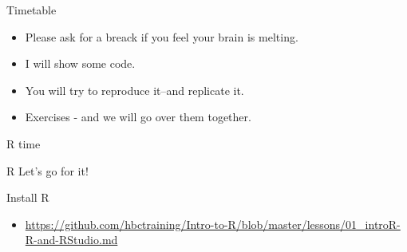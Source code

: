 \documentclass{beamer}
\begin{document}
 \begin{frame}{Timetable}
\begin{itemize}[<+->]
\item Please ask for a breack if you feel your brain is melting.
\item I will show some code.
\item You will try to reproduce it--and replicate it.
\item Exercises - and we will go over them together.
   \end{itemize} 
\end{frame}



\begin{frame}{R time}
\begin{block}{R} 
Let's go for it!
\end{block}
\end{frame}



\begin{frame}{Install R}
\begin{itemize}
\item \url{https://github.com/hbctraining/Intro-to-R/blob/master/lessons/01_introR-R-and-RStudio.md}
   \end{itemize} 
\end{frame}

  \maketitle
\end{document}
